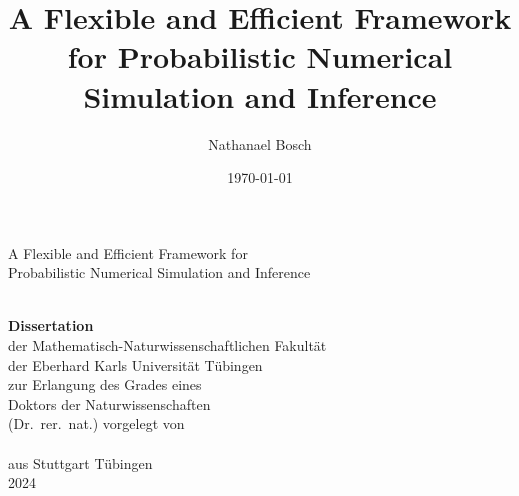 \documentclass{mimosis}
\author{Nathanael Bosch}
\date{\today}
\title{A Flexible and Efficient Framework for Probabilistic Numerical Simulation and Inference}
\begin{document}
\frontmatter
\begin{titlepage}
  \vspace*{2cm}
  \makeatletter
  \begin{center}
  \sffamily
    \begin{huge}
      A Flexible and Efficient Framework for\\[0.5em] Probabilistic Numerical Simulation and Inference
    \end{huge}\\[0.1cm]
    \vfill
    {\bfseries Dissertation}\\[0pt]
			{%
				der Mathematisch-Naturwissenschaftlichen Fakultät\\
				der Eberhard Karls Universität Tübingen\\
				zur Erlangung des Grades eines\\
				Doktors der Naturwissenschaften\\
				(Dr.\ rer.\ nat.)}
    \vfill
    vorgelegt von\\
    \@author\\
    aus Stuttgart
    \vfill
    Tübingen\\
    2024
  \end{center}
  \makeatother
\end{titlepage}

\clearpage\normalsize
%
\clearpage
\end{document}
